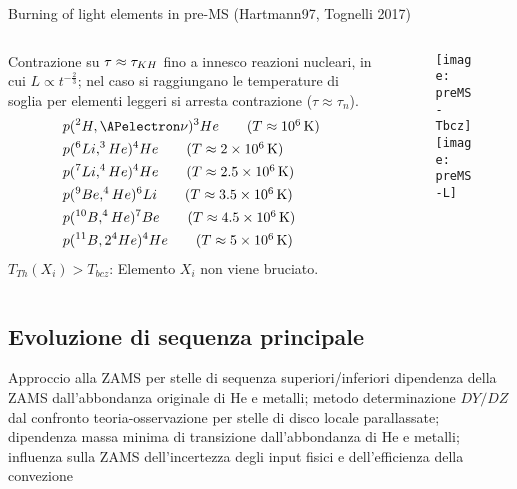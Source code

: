 \begin{frame}{Burning of light elements in pre-MS (Hartmann97, Tognelli 2017)}
    \begin{columns}[T]
        \begin{column}{0.6\textwidth}
    Contrazione su $\tau\approx\tau_{KH}{}$ fino a innesco reazioni nucleari, in cui $L\propto t^{-\frac{2}{3}}$; nel caso si raggiungano le temperature di soglia per elementi leggeri si arresta contrazione ($\tau\approx\tau_n$).
            \begin{align*}
                &p(^2H,\APelectron\nu)^3He\tag{$T\approx\SI{e6}{\kelvin}$}\\
                &p(^6Li,^3He)^4He\tag{$T\approx\SI{2e6}{\kelvin}$}\\
                &p(^7Li,^4He)^4He\tag{$T\approx\SI{2.5e6}{\kelvin}$}\\
                &p(^9Be,^4He)^6Li\tag{$T\approx\SI{3.5e6}{\kelvin}$}\\
                &p(^{10}B,^4He)^7Be\tag{$T\approx\SI{4.5e6}{\kelvin}$}\\
                &p(^{11}B,2 ^4He)^4He\tag{$T\approx\SI{5e6}{\kelvin}$}
            \end{align*}
            $T_{Th}(X_i)>T_{bcz}$: Elemento $X_i$ non viene bruciato.
        \end{column}
        \begin{column}{0.4\textwidth}
			\begin{figure}[!ht]
                \texttt{[image: preMS-Tbcz]}\label{fig:preMS-Tbcz}
                \texttt{[image: preMS-L]}\label{fig:preMS-L}
			\end{figure}
        \end{column}
    \end{columns}
    
\end{frame}

\subsection{Evoluzione di sequenza principale}

\begin{frame}{Approccio alla ZAMS per stelle di sequenza superiori/inferiori}
dipendenza della ZAMS dall'abbondanza originale di He e metalli; metodo determinazione $DY/DZ$ dal confronto teoria-osservazione per stelle di disco locale parallassate; dipendenza massa minima di transizione dall'abbondanza di He e metalli; influenza sulla ZAMS dell'incertezza degli input fisici e dell'efficienza della convezione
\end{frame}

